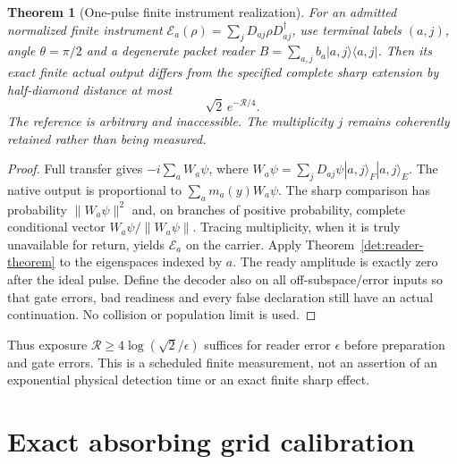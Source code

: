 \documentclass[11pt,oneside,openany]{book}
\newtheorem{theorem}{Theorem}[chapter]
\theoremstyle{definition}
\theoremstyle{remark}\newtheorem{remark}[theorem]{Remark}
\begin{document}
\begin{theorem}[One-pulse finite instrument realization]
\label{det:one-pulse}
For an admitted normalized finite instrument
$\mathcal E_a(\rho)=\sum_jD_{aj}\rho D_{aj}^\dagger$, use terminal
labels $(a,j)$, angle $\theta=\pi/2$ and a degenerate packet reader
$B=\sum_{a,j}b_a|a,j\rangle\langle a,j|$. Then its exact finite
actual output differs from the specified complete sharp extension by
half-diamond distance at most
\begin{equation}
 \sqrt2\,e^{-\mathcal R/4}.                    \label{det:one-pulse-bound}
\end{equation}
The reference is arbitrary and inaccessible. The multiplicity $j$
remains coherently retained rather than being measured.
\end{theorem}
\begin{proof}
Full transfer gives $-i\sum_aW_a\psi$, where
$W_a\psi=\sum_jD_{aj}\psi|a,j\rangle_F|a,j\rangle_E$.
The native output is proportional to $\sum_am_a(y)W_a\psi$.
The sharp comparison has probability $\|W_a\psi\|^2$ and, on branches
of positive probability, complete conditional vector $W_a\psi/\|W_a\psi\|$. Tracing multiplicity,
when it is truly unavailable for return, yields $\mathcal E_a$ on
the carrier. Apply Theorem~\ref{det:reader-theorem} to the eigenspaces
indexed by $a$. The ready amplitude is exactly zero after the ideal
pulse. Define the decoder also on all off-subspace/error inputs so
that gate errors, bad readiness and every false declaration still
have an actual continuation. No collision or population limit is used.
\end{proof}

Thus exposure $\mathcal R\ge4\log(\sqrt2/\epsilon)$ suffices for
reader error $\epsilon$ before preparation and gate errors. This is a
scheduled finite measurement, not an assertion of an exponential
physical detection time or an exact finite sharp effect.

\section{Exact absorbing grid calibration}
\end{document}
